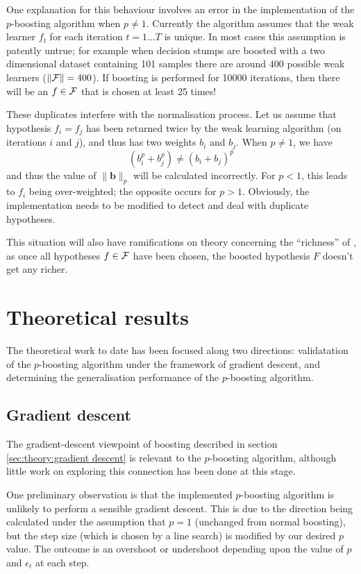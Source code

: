 One explanation for this behaviour involves an error in the
implementation of the $p$-boosting algorithm when $p \neq 1$.
Currently the algorithm assumes that the weak learner $f_t$ for each
iteration $t = 1 \ldots T$ is unique.  In most cases this assumption
is patently untrue; for example when decision stumps are boosted with
a two dimensional dataset containing 101 samples there are around
400 possible weak learners ($\|\mathcal{F}\| = 400$).  If boosting is
performed for 10000
iterations, then there will be an $f \in \mathcal{F}$ that is chosen at
least 25 times!

These duplicates interfere with the normalisation process.  Let us
assume that hypothesis $f_i = f_j$ has been returned twice by the weak
learning algorithm (on iterations $i$ and $j$), and thus has two
weights $b_i$ and $b_j$.  When $p \neq 1$, we have 
%
\begin{equation}
(b_i^p + b_j^p) \neq (b_i + b_j)^p
\end{equation}
%
and thus the value of $\|\mathbf{b}\|_p$ will be calculated
incorrectly.  For $p < 1$, this leads to $f_i$ being over-weighted;
the opposite occurs for $p > 1$.  Obviously, the implementation needs
to be modified to detect and deal with duplicate hypotheses.

This situation will also have ramifications on theory concerning the
``richness'' of \calF, as once all
hypotheses $f \in \mathcal{F}$ have been chosen, the boosted hypothesis $F$
doesn't get any richer.


\section{Theoretical results}

The theoretical work to date has been focused along two directions:
validatation of the $p$-boosting algorithm under the framework of
gradient descent, and determining the generalisation performance of
the $p$-boosting algorithm.


\subsection{Gradient descent}
\label{sec:current:gradient descent}

The gradient-descent viewpoint of boosting described in section
\ref{sec:theory:gradient descent} is relevant to the
$p$-boosting algorithm, although little work on exploring this
connection has been done at this stage.

One preliminary observation is that the implemented $p$-boosting algorithm
is unlikely to perform a sensible gradient
descent.  This is due to the direction being calculated under the
assumption that $p=1$ (unchanged from normal boosting), but the step
size (which is chosen by a line search) is modified by our desired
$p$ value.  The outcome is an overshoot or undershoot depending upon
the value of $p$ and $\epsilon_t$ at each step.

